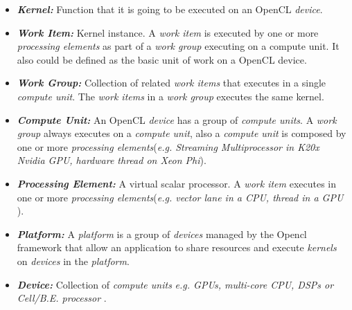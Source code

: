 
\begin{itemize}
    \item\textbf{\textit{Kernel:}} Function that it is going to be executed on an OpenCL \emph{device}\cite{opencl12}. 

    \item\textbf{\textit{Work Item:}} Kernel instance. A \emph{work item} is executed by one or more \emph{processing elements} as 
        part of a \emph{work group} executing on a compute unit\cite{opencl12}. It also could be defined as the basic unit of work
        on a OpenCL device\cite{intro_opencl}.

    \item\textbf{\textit{Work Group:}} Collection of related \emph{work items} that executes in a single \emph{compute unit}. The 
        \emph{work items} in a \emph{work group} executes the same kernel\cite{opencl12}.

    \item\textbf{\textit{Compute Unit:}} An OpenCL \emph{device} has a group of \emph{compute units}. A \emph{work group} always
        executes on a \emph{compute unit}, also a \emph{compute unit} is composed by one or more 
        \emph{processing elements}\cite{opencl12}(\emph{e.g. Streaming Multiprocessor in K20x Nvidia GPU, 
        hardware thread on Xeon Phi}).

    \item\textbf{\textit{Processing Element:}} A virtual scalar processor. A \emph{work item} executes in one or more 
        \emph{processing elements}\cite{opencl12}(\emph{e.g. vector lane in a CPU, thread in a GPU }). 

    \item\textbf{\textit{Platform:}} A \emph{platform} is a group of \emph{devices} managed by the Opencl framework 
        that allow an application to share resources and execute \emph{kernels} on \emph{devices} in the 
        \emph{platform}\cite{opencl12}.

    \item\textbf{\textit{Device:}} Collection of \emph{compute units} \emph{e.g. GPUs, multi-core CPU, DSPs or Cell/B.E. processor}
        \cite{opencl12}.
\end{itemize}




